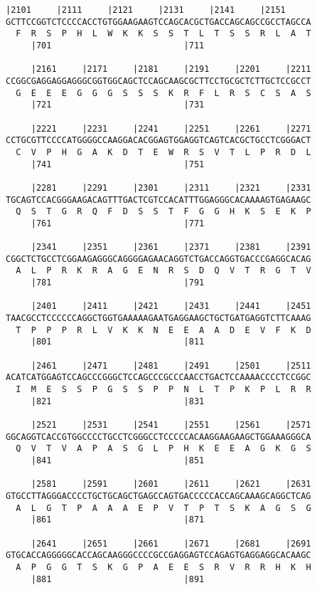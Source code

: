 \documentclass{article}
\begin{document}
\begin{Verbatim}[fontfamily=courier]
     |2101     |2111     |2121     |2131     |2141     |2151
GCTTCCGGTCTCCCCACCTGTGGAAGAAGTCCAGCACGCTGACCAGCAGCCGCCTAGCCA
  F  R  S  P  H  L  W  K  K  S  S  T  L  T  S  S  R  L  A  T
     |701                          |711                     

     |2161     |2171     |2181     |2191     |2201     |2211
CCGGCGAGGAGGAGGGCGGTGGCAGCTCCAGCAAGCGCTTCCTGCGCTCTTGCTCCGCCT
  G  E  E  E  G  G  G  S  S  S  K  R  F  L  R  S  C  S  A  S
     |721                          |731                     

     |2221     |2231     |2241     |2251     |2261     |2271
CCTGCGTTCCCCATGGGGCCAAGGACACGGAGTGGAGGTCAGTCACGCTGCCTCGGGACT
  C  V  P  H  G  A  K  D  T  E  W  R  S  V  T  L  P  R  D  L
     |741                          |751                     

     |2281     |2291     |2301     |2311     |2321     |2331
TGCAGTCCACGGGAAGACAGTTTGACTCGTCCACATTTGGAGGGCACAAAAGTGAGAAGC
  Q  S  T  G  R  Q  F  D  S  S  T  F  G  G  H  K  S  E  K  P
     |761                          |771                     

     |2341     |2351     |2361     |2371     |2381     |2391
CGGCTCTGCCTCGGAAGAGGGCAGGGGAGAACAGGTCTGACCAGGTGACCCGAGGCACAG
  A  L  P  R  K  R  A  G  E  N  R  S  D  Q  V  T  R  G  T  V
     |781                          |791                     

     |2401     |2411     |2421     |2431     |2441     |2451
TAACGCCTCCCCCCAGGCTGGTGAAAAAGAATGAGGAAGCTGCTGATGAGGTCTTCAAAG
  T  P  P  P  R  L  V  K  K  N  E  E  A  A  D  E  V  F  K  D
     |801                          |811                     

     |2461     |2471     |2481     |2491     |2501     |2511
ACATCATGGAGTCCAGCCCGGGCTCCAGCCCGCCCAACCTGACTCCAAAACCCCTCCGGC
  I  M  E  S  S  P  G  S  S  P  P  N  L  T  P  K  P  L  R  R
     |821                          |831                     

     |2521     |2531     |2541     |2551     |2561     |2571
GGCAGGTCACCGTGGCCCCTGCCTCGGGCCTCCCCCACAAGGAAGAAGCTGGAAAGGGCA
  Q  V  T  V  A  P  A  S  G  L  P  H  K  E  E  A  G  K  G  S
     |841                          |851                     

     |2581     |2591     |2601     |2611     |2621     |2631
GTGCCTTAGGGACCCCTGCTGCAGCTGAGCCAGTGACCCCCACCAGCAAAGCAGGCTCAG
  A  L  G  T  P  A  A  A  E  P  V  T  P  T  S  K  A  G  S  G
     |861                          |871                     

     |2641     |2651     |2661     |2671     |2681     |2691
GTGCACCAGGGGGCACCAGCAAGGGCCCCGCCGAGGAGTCCAGAGTGAGGAGGCACAAGC
  A  P  G  G  T  S  K  G  P  A  E  E  S  R  V  R  R  H  K  H
     |881                          |891                     


\end{Verbatim}
\end{document}
